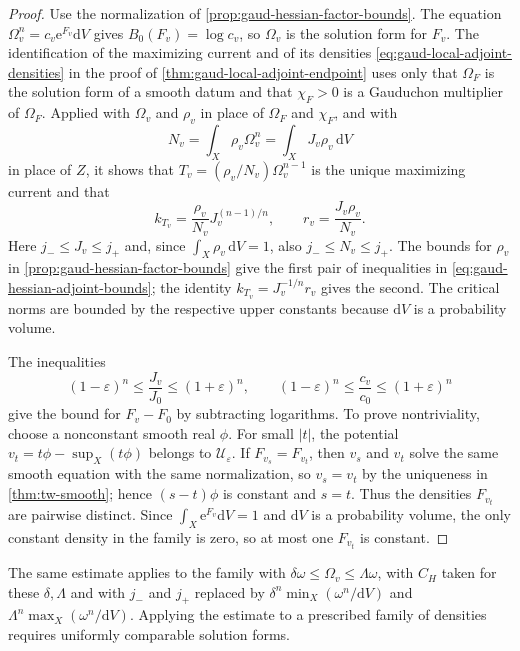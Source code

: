 \begin{proof}
Use the normalization of \cref{prop:gaud-hessian-factor-bounds}. The equation $\Omega_v^n=c_v\mathrm e^{F_v}\mathrm{d}V$ gives $B_0(F_v)=\log c_v$, so $\Omega_v$ is the solution form for $F_v$. The identification of the maximizing current and of its densities \eqref{eq:gaud-local-adjoint-densities} in the proof of \cref{thm:gaud-local-adjoint-endpoint} uses only that $\Omega_F$ is the solution form of a smooth datum and that $\chi_F>0$ is a Gauduchon multiplier of $\Omega_F$. Applied with $\Omega_v$ and $\rho_v$ in place of $\Omega_F$ and $\chi_F$, and with
\[
 N_v=\int_X\rho_v\Omega_v^n=\int_XJ_v\rho_v\,\mathrm{d}V
\]
in place of $Z$, it shows that $T_v=(\rho_v/N_v)\Omega_v^{n-1}$ is the unique maximizing current and that
\begin{equation}\label{eq:gaud-hessian-adjoint-densities}
 k_{T_v}=\frac{\rho_v}{N_v}J_v^{(n-1)/n},
 \qquad
 r_v=\frac{J_v\rho_v}{N_v}.
\end{equation}
Here $j_-\leq J_v\leq j_+$ and, since $\int_X\rho_v\,\mathrm{d}V=1$, also $j_-\leq N_v\leq j_+$. The bounds for $\rho_v$ in \cref{prop:gaud-hessian-factor-bounds} give the first pair of inequalities in \eqref{eq:gaud-hessian-adjoint-bounds}; the identity $k_{T_v}=J_v^{-1/n}r_v$ gives the second. The critical norms are bounded by the respective upper constants because $\mathrm{d}V$ is a probability volume.

The inequalities
\[
 (1-\varepsilon)^n\leq\frac{J_v}{J_0}\leq(1+\varepsilon)^n,
 \qquad
 (1-\varepsilon)^n\leq\frac{c_v}{c_0}\leq(1+\varepsilon)^n
\]
give the bound for $F_v-F_0$ by subtracting logarithms. To prove nontriviality, choose a nonconstant smooth real $\phi$. For small $|t|$, the potential $v_t=t\phi-\sup_X(t\phi)$ belongs to $\mathcal U_\varepsilon$. If $F_{v_s}=F_{v_t}$, then $v_s$ and $v_t$ solve the same smooth equation with the same normalization, so $v_s=v_t$ by the uniqueness in \cref{thm:tw-smooth}; hence $(s-t)\phi$ is constant and $s=t$. Thus the densities $F_{v_t}$ are pairwise distinct. Since $\int_X\mathrm e^{F_v}\mathrm{d}V=1$ and $\mathrm{d}V$ is a probability volume, the only constant density in the family is zero, so at most one $F_{v_t}$ is constant.
\end{proof}



The same estimate applies to the family with $\delta\omega\leq\Omega_v\leq\Lambda\omega$, with $C_H$ taken for these $\delta,\Lambda$ and with $j_-$ and $j_+$ replaced by $\delta^n\min_X(\omega^n/\mathrm{d}V)$ and $\Lambda^n\max_X(\omega^n/\mathrm{d}V)$. Applying the estimate to a prescribed family of densities requires uniformly comparable solution forms.
